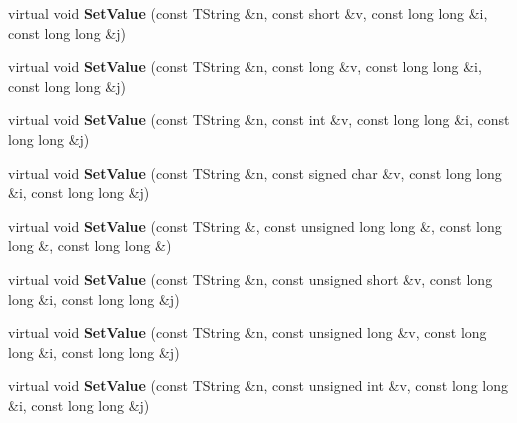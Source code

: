\begin{DoxyCompactItemize}
\item 
\hypertarget{class_h_a_l_1_1_analysis_data_ad17c472ec1b6a6a0259c26bc5e1d68a9}{virtual void {\bfseries Set\+Value} (const T\+String \&n, const short \&v, const long long \&i, const long long \&j)}\label{class_h_a_l_1_1_analysis_data_ad17c472ec1b6a6a0259c26bc5e1d68a9}

\item 
\hypertarget{class_h_a_l_1_1_analysis_data_a4ab8550b85c33c0d04fcc381c845a5c4}{virtual void {\bfseries Set\+Value} (const T\+String \&n, const long \&v, const long long \&i, const long long \&j)}\label{class_h_a_l_1_1_analysis_data_a4ab8550b85c33c0d04fcc381c845a5c4}

\item 
\hypertarget{class_h_a_l_1_1_analysis_data_a9e7eea804e43369c4a4a8c3b1dacad37}{virtual void {\bfseries Set\+Value} (const T\+String \&n, const int \&v, const long long \&i, const long long \&j)}\label{class_h_a_l_1_1_analysis_data_a9e7eea804e43369c4a4a8c3b1dacad37}

\item 
\hypertarget{class_h_a_l_1_1_analysis_data_aebc6089b43396b0f19c1e06862be5448}{virtual void {\bfseries Set\+Value} (const T\+String \&n, const signed char \&v, const long long \&i, const long long \&j)}\label{class_h_a_l_1_1_analysis_data_aebc6089b43396b0f19c1e06862be5448}

\item 
\hypertarget{class_h_a_l_1_1_analysis_data_ae89756ae4ac0bf7cffbd22fbb54a2ec0}{virtual void {\bfseries Set\+Value} (const T\+String \&, const unsigned long long \&, const long long \&, const long long \&)}\label{class_h_a_l_1_1_analysis_data_ae89756ae4ac0bf7cffbd22fbb54a2ec0}

\item 
\hypertarget{class_h_a_l_1_1_analysis_data_a3f98354687b412c2fb8e84615211d314}{virtual void {\bfseries Set\+Value} (const T\+String \&n, const unsigned short \&v, const long long \&i, const long long \&j)}\label{class_h_a_l_1_1_analysis_data_a3f98354687b412c2fb8e84615211d314}

\item 
\hypertarget{class_h_a_l_1_1_analysis_data_af569db19521306fa14e85bd9d784a17f}{virtual void {\bfseries Set\+Value} (const T\+String \&n, const unsigned long \&v, const long long \&i, const long long \&j)}\label{class_h_a_l_1_1_analysis_data_af569db19521306fa14e85bd9d784a17f}

\item 
\hypertarget{class_h_a_l_1_1_analysis_data_a9c57d185dc584fdfb7f38b86e5f47f53}{virtual void {\bfseries Set\+Value} (const T\+String \&n, const unsigned int \&v, const long long \&i, const long long \&j)}\label{class_h_a_l_1_1_analysis_data_a9c57d185dc584fdfb7f38b86e5f47f53}


\end{DoxyCompactItemize}
